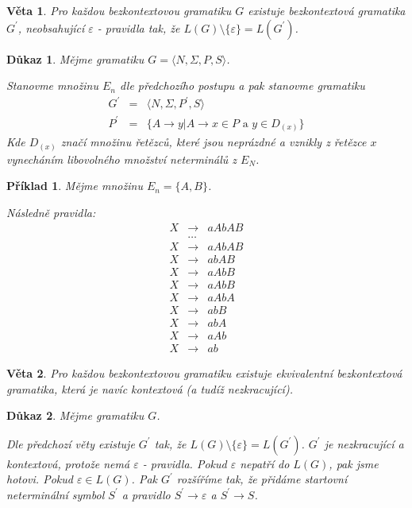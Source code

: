 \documentclass[10pt, a4paper, titlepage]{article}
\theoremstyle{note}
\newtheorem{dukaz}{Důkaz}
\newtheorem{veta}{Věta}
\newtheorem{priklad}{Příklad}
\begin{document}
\begin{veta}
Pro každou bezkontextovou gramatiku $G$ existuje bezkontextová gramatika $G^{'}$, neobsahující $\varepsilon$ - pravidla tak, že $L(G) \setminus \lbrace \varepsilon \rbrace = L(G^{'})$.
\end{veta}

\begin{dukaz}
Mějme gramatiku $G = \langle N, \Sigma, P,S \rangle$.

Stanovme množinu $E_{n}$ dle předchozího postupu a pak stanovme gramatiku
\begin{eqnarray*}
G^{'} &=& \langle N, \Sigma, P^{'},S \rangle \\
P^{'} &=& \lbrace A \rightarrow y|A \rightarrow x \in P \text{ a } y \in D_{(x)} \rbrace
\end{eqnarray*}
Kde $D_{(x)}$ značí množinu řetězců, které jsou neprázdné a vznikly z řetězce $x$ vynecháním
libovolného množství neterminálů z $E_{N}$.
\end{dukaz}

\begin{priklad}
Mějme množinu $E_{n} = \lbrace A, B \rbrace$.

Následně pravidla:
\begin{eqnarray*}
X &\rightarrow& aAbAB \\
&\ldots& \\
X &\rightarrow& aAbAB \\
X &\rightarrow& abAB \\
X &\rightarrow& aAbB \\
X &\rightarrow& aAbB \\
X &\rightarrow& aAbA \\
X &\rightarrow& abB \\
X &\rightarrow& abA \\
X &\rightarrow& aAb \\
X &\rightarrow& ab
\end{eqnarray*}
\end{priklad}

\begin{veta}
Pro každou bezkontextovou gramatiku existuje ekvivalentní bezkontextová gramatika, která je navíc kontextová (a tudíž nezkracující).
\end{veta}

\begin{dukaz}
Mějme gramatiku $G$.

Dle předchozí věty existuje $G^{'}$ tak, že $L(G) \setminus \lbrace \varepsilon \rbrace = L(G^{'})$.
$G^{'}$ je nezkracující a kontextová, protože nemá $\varepsilon$ - pravidla. Pokud $\varepsilon$ nepatří do $L(G)$, pak jsme hotovi.
Pokud $\varepsilon \in L(G)$. Pak $G^{'}$ rozšíříme tak, že přidáme startovní neterminální symbol $S^{'}$ 
a pravidlo $S^{'} \rightarrow \varepsilon$ a $S^{'} \rightarrow S$.
\end{dukaz}
\end{document}
